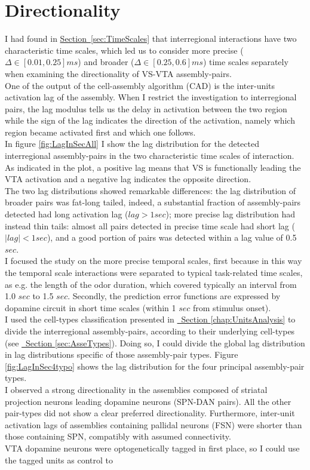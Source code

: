 \section{Directionality} 
\label{sec:Directionality}
 I had found in \hyperref[sec:TimeScales]{Section~\ref*{sec:TimeScales}} that interregional interactions have two characteristic time scales, which led us to consider more precise ($\Delta \in [0.01,0.25] ms$) and broader ($\Delta \in [0.25,0.6] ms$) time scales separately when examining the directionality of VS-VTA assembly-pairs.\\One of the output of the cell-assembly algorithm (CAD) is the inter-units activation lag of the assembly. When I restrict the investigation to interregional pairs, the lag modulus tells us the delay in activation between the two region while the sign of the lag indicates the direction of the activation, namely which region became activated first and which one follows.\\In figure \ref{fig:LagInSecAll} I show the lag distribution for the detected interregional assembly-pairs in the two characteristic time scales of interaction. As indicated in the plot, a positive lag means that VS is functionally leading the VTA activation and a negative lag indicates the opposite direction.\\The two lag distributions showed remarkable differences: the lag distribution of broader pairs was fat-long tailed, indeed, a substantial fraction of assembly-pairs detected had long activation lag ($lag > 1 sec$); more precise lag distribution had instead thin tails: almost all pairs detected in precise time scale had short lag ($|lag| < 1 sec$), and a good portion of pairs was detected within a lag value of 0.5 $sec$.\\I focused the study on the more precise temporal scales, first because in this way the temporal scale interactions were separated to typical task-related time scales, as e.g. the length of the odor duration, which covered typically an interval from 1.0 $sec$ to 1.5 $sec$. Secondly, the prediction error functions are expressed by dopamine circuit in short time scales (within 1 $sec$ from stimulus onset).\\ I used the cell-types classification presented in \hyperref[chap:UnitsAnalysis]{~Section \ref*{chap:UnitsAnalysis}} to divide the interregional assembly-pairs, according to their underlying cell-types (see \hyperref[sec:AsseTypes]{~Section \ref*{sec:AsseTypes}}). Doing so, I could divide the global lag distribution in lag distributions specific of those assembly-pair types. Figure \ref{fig:LagInSec4typo} shows the lag distribution for the four principal assembly-pair types.\\I observed a strong directionality in the assemblies composed of striatal projection neurons leading dopamine neurons (SPN-DAN pairs). All the other pair-types did not show a clear preferred directionality. Furthermore, inter-unit activation lags of assemblies containing pallidal neurons (FSN) were shorter than those containing SPN, compatibly with assumed connectivity.\\VTA dopamine neurons were optogenetically tagged in first place, so I could use the tagged units as control to 